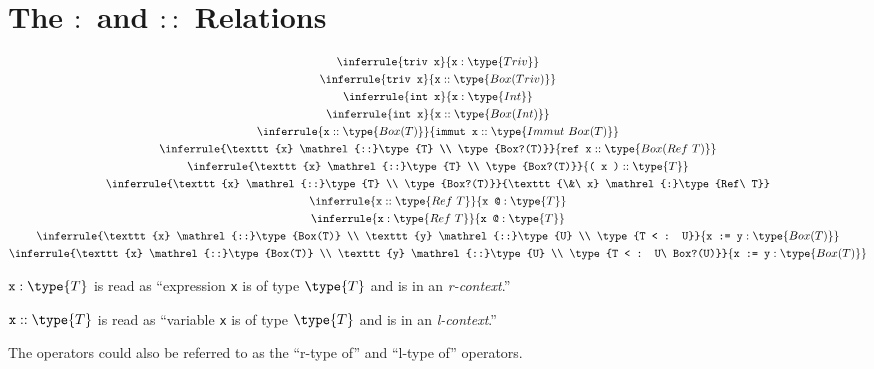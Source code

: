 \documentclass{article}
\newcommand\rtypeof{\mathrel{:}}
\newcommand\ltypeof{\mathrel{::}}
\newcommand{\syntax}{\texttt}
\begin{document}
\section*{The $\rtypeof$ and $\ltypeof$ Relations}

\begin{gather}
  \inferrule{\syntax{triv x}}{\syntax{x} \rtypeof \type{Triv}}\\
  \inferrule{\syntax{triv x}}{\syntax{x} \ltypeof \type{Box(Triv)}}\\
  \inferrule{\syntax{int x}}{\syntax{x} \rtypeof \type{Int}}\\
  \inferrule{\syntax{int x}}{\syntax{x} \ltypeof \type{Box(Int)}}\\
  \inferrule{\syntax{x} \ltypeof \type{Box(T)}}{\syntax{immut\ x} \ltypeof \type{Immut\ Box(T)}}\\
  \inferrule{\syntax{x} \ltypeof \type{T} \\ \type{Box?(T)}}{\syntax{ref\ x} \ltypeof \type{Box(Ref\ T)}}\\
  \inferrule{\syntax{x} \ltypeof \type{T} \\ \type{Box?(T)}}{\syntax{(\ x\ )} \ltypeof \type{T}}\\
  \inferrule{\syntax{x} \ltypeof \type{T} \\ \type{Box?(T)}}{\syntax{\&\ x} \rtypeof \type{Ref\ T}}\\
  \inferrule{\syntax{x} \ltypeof \type{Ref\ T}}{\syntax{x\ @} \rtypeof \type{T}}\\
  \inferrule{\syntax{x} \rtypeof \type{Ref\ T}}{\syntax{x\ @} \rtypeof \type{T}}\\
  \inferrule{\syntax{x} \ltypeof \type{Box(T)} \\ \syntax{y} \ltypeof \type{U} \\ \type{T < : U}}{\syntax{x := y}:\type{Box(T)}}\\
  \inferrule{\syntax{x} \ltypeof \type{Box(T)} \\ \syntax{y} \ltypeof \type{U} \\ \type{T < : U\ Box?(U)}}{\syntax{x := y}:\type{Box(T)}}
\end{gather}

$\syntax{x} : \type{T}$ is read as ``expression \syntax{x} is of type
$\type{T}$ and is in an \textit{r-context}.''

$\syntax{x} :: \type{T}$ is read as ``variable \syntax{x} is of type $\type{T}$
and is in an \textit{l-context}.''

The operators could also be referred to as the ``r-type of'' and ``l-type of''
operators.
\end{document}
